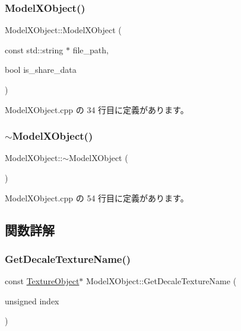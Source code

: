 \subsubsection{\texorpdfstring{Model\+X\+Object()}{ModelXObject()}}
{\footnotesize\ttfamily Model\+X\+Object\+::\+Model\+X\+Object (\begin{DoxyParamCaption}\item[{const std\+::string $\ast$}]{file\+\_\+path,  }\item[{bool}]{is\+\_\+share\+\_\+data }\end{DoxyParamCaption})}



 Model\+X\+Object.\+cpp の 34 行目に定義があります。

\mbox{\label{class_model_x_object_a33553f8ab78dfd3c9d571a048ae85324}} 
\subsubsection{\texorpdfstring{$\sim$\+Model\+X\+Object()}{~ModelXObject()}}
{\footnotesize\ttfamily Model\+X\+Object\+::$\sim$\+Model\+X\+Object (\begin{DoxyParamCaption}{ }\end{DoxyParamCaption})\hspace{0.3cm}{\ttfamily [virtual]}}



 Model\+X\+Object.\+cpp の 54 行目に定義があります。



\subsection{関数詳解}
\mbox{\label{class_model_x_object_afd57d5b6b74817f4d69047640e69f14e}} 
\subsubsection{\texorpdfstring{Get\+Decale\+Texture\+Name()}{GetDecaleTextureName()}}
{\footnotesize\ttfamily const \mbox{\hyperlink{class_texture_object}{Texture\+Object}}$\ast$ Model\+X\+Object\+::\+Get\+Decale\+Texture\+Name (\begin{DoxyParamCaption}\item[{unsigned}]{index }\end{DoxyParamCaption})\hspace{0.3cm}{\ttfamily [inline]}}



